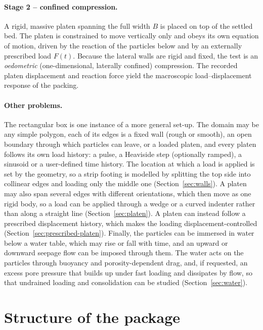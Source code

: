 \paragraph{Stage 2 -- confined compression.}
A rigid, massive platen spanning the full width $B$ is placed on top of the
settled bed.  The platen is constrained to move vertically only and obeys its
own equation of motion, driven by the reaction of the particles below and by an
externally prescribed load $F(t)$.  Because the lateral walls are rigid and
fixed, the test is an \emph{oedometric} (one-dimensional, laterally confined)
compression.  The recorded platen displacement and reaction force yield the
macroscopic load--displacement response of the packing.

\paragraph{Other problems.}
The rectangular box is one instance of a more general set-up.  The domain may be
any simple polygon, each of its edges is a fixed wall (rough or smooth), an open
boundary through which particles can leave, or a loaded platen, and every
platen follows its own load history: a pulse, a Heaviside step (optionally
ramped), a sinusoid or a user-defined time history.  The location at which a
load is applied is set by the geometry, so a strip footing is modelled by
splitting the top side into collinear edges and loading only the middle one
(Section~\ref{sec:walls}).  A platen may also span several edges with different
orientations, which then move as one rigid body, so a load can be applied
through a wedge or a curved indenter rather than along a straight line
(Section~\ref{sec:platen}).
A platen can instead follow a prescribed displacement history, which makes the loading displacement-controlled (Section~\ref{sec:prescribed-platen}).
Finally, the particles can be immersed in water
below a water table, which may rise or fall with time, and an upward or
downward seepage flow can be imposed through them.  The water acts on the
particles through buoyancy and porosity-dependent drag, and, if requested, an
excess pore pressure that builds up under fast loading and dissipates by flow,
so that undrained loading and consolidation can be studied
(Section~\ref{sec:water}).

\section{Structure of the package}
\label{sec:structure}

